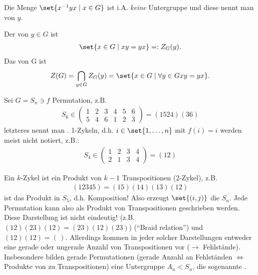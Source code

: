\begin{definition}[Konjugationsklasse]
	Die Menge $\set{x^{-1}yx \mid x \in G}$ ist i.A. \emph{keine} Untergruppe und diese nennt man  von $y$.
\end{definition}

\begin{definition}
	Der  von $y \in G$ ist
	\begin{align*}
		\set{x \in G \mid xy = yx} =: Z_G(y).
	\end{align*}
	Das  von G ist
	\begin{align*}
		Z(G) = \bigcap_{y \in G} Z_G(y) = \set{x \in G \mid \forall y \in G xy=yx}.
	\end{align*}
\end{definition}
\begin{example}
	Sei $G = S_n \ni f$ Permutation, z.B.
	\begin{align*} S_6 \in
		\begin{pmatrix}
		1 & 2 &3 &4 & 5 & 6\\
		5 & 4 & 6 & 1 & 2 & 3
		\end{pmatrix}  = (1524)(36)
	\end{align*}
	letzteres nennt man . 1-Zykeln, d.h. $i \in \set{1,\dots,n}$ mit $f(i)=i$ werden meist nicht notiert, z.B.:
	\begin{align*} S_4 \in 
		\begin{pmatrix}
			1&2&3&4\\
			2&1&3&4
		\end{pmatrix} = (12)
	\end{align*}
\end{example}
\begin{remark}
	Ein $k$-Zykel ist ein Produkt von $k-1$ Transpositionen (2-Zykel), z.B.
	\begin{align*}
		(12345) = (15)(14)(13)(12)
	\end{align*}
	ist das Produkt in $S_5$, d.h. Komposition! Also erzeugt $\set{(i,j)}$ die $S_n$. Jede Permutation kann also als Produkt von Transpositionen geschrieben werden. Diese Darstellung ist nicht eindeutig! (z.B. $(12)(23)(12) = (23)(12)(23)$) (``Braid relation'') %
	und $(12)(12) = (\,)$. Allerdings kommen in jeder solcher Darstellungen entweder eine gerade oder ungerade Anzahl von Transpositionen vor ($\to$ Fehlstände). Insbesondere bilden gerade Permutationen (gerade Anzahl an Fehlständen $\Leftrightarrow$ Produkte von zu Transpositionen) eine Untergruppe $A_n < S_n$, die sogenannte .
\end{remark}
